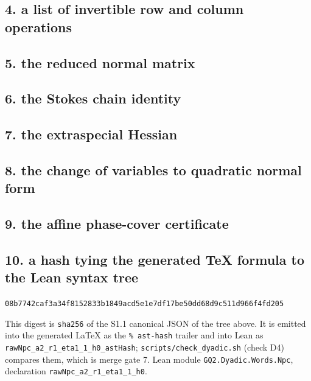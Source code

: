 \subsection{4. a list of invertible row and column operations}

\subsection{5. the reduced normal matrix}

\subsection{6. the Stokes chain identity}

\subsection{7. the extraspecial Hessian}

\subsection{8. the change of variables to quadratic normal form}

\subsection{9. the affine phase-cover certificate}

\subsection{10. a hash tying the generated TeX formula to the Lean syntax tree}
\begin{center}\texttt{08b7742caf3a34f8152833b1849acd5e1e7df17be50dd68d9c511d966f4fd205}\end{center}
This digest is \texttt{sha256} of the S1.1 canonical JSON of the tree above.  It is emitted into the generated \LaTeX{} as the \texttt{\% ast-hash} trailer and into Lean as \texttt{rawNpc\_a2\_r1\_eta1\_1\_h0\_astHash}; \texttt{scripts/check\_dyadic.sh} (check D4) compares them, which is merge gate 7.
Lean module \texttt{GQ2.Dyadic.Words.Npc}, declaration \texttt{rawNpc\_a2\_r1\_eta1\_1\_h0}.

